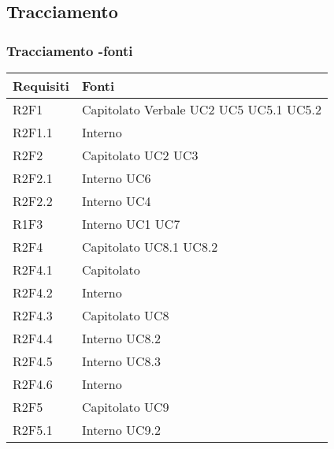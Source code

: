 \subsection{Tracciamento}
\subsubsection{Tracciamento -fonti}
\begin{center}
	\renewcommand{\arraystretch}{1.5}
	\begin{longtable}{  p{5cm} p{5cm} }
		\rowcolor{tableHeadYellow}
		\textbf{Requisiti} & \textbf{Fonti} \\
		\endhead 
		
		R2F1 & Capitolato \newline Verbale \newline UC2 \newline UC5 
				\newline UC5.1 \newline UC5.2\\
		R2F1.1 & Interno \\
		R2F2 & Capitolato \newline UC2 \newline UC3 \\
		R2F2.1 & Interno \newline UC6 \\
		R2F2.2 & Interno \newline UC4 \\
		R1F3 & Interno \newline UC1 \newline UC7 \\
		R2F4 & Capitolato \newline UC8.1 \newline UC8.2\\
		R2F4.1 & Capitolato \\
		R2F4.2 & Interno \\
		R2F4.3 & Capitolato \newline UC8 \\
		R2F4.4 & Interno \newline UC8.2 \\
		R2F4.5 & Interno \newline UC8.3 \\
		R2F4.6 & Interno \\
		R2F5 & Capitolato \newline UC9 \\
		R2F5.1 & Interno \newline UC9.2 \\

\end{longtable}
\end{center}

